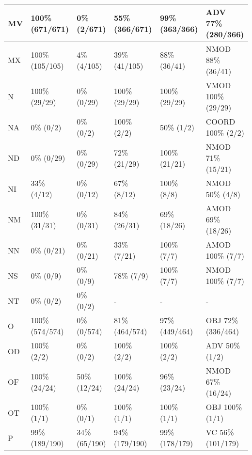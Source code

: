 \begin{small}
\begin{longtable}{|l|l|l|l|l|l|}
\hline
MV & 100\% (671/671) & 0\% (2/671) & 55\% (366/671) & 99\% (363/366) & ADV 77\% (280/366) \\ 
\hline
MX & 100\% (105/105) & 4\% (4/105) & 39\% (41/105) & 88\% (36/41) & NMOD 88\% (36/41) \\ 
\hline
N & 100\% (29/29) & 0\% (0/29) & 100\% (29/29) & 100\% (29/29) & VMOD 100\% (29/29) \\ 
\hline
NA & 0\% (0/2) & 0\% (0/2) & 100\% (2/2) & 50\% (1/2) & COORD 100\% (2/2) \\ 
\hline
ND & 0\% (0/29) & 0\% (0/29) & 72\% (21/29) & 100\% (21/21) & NMOD 71\% (15/21) \\ 
\hline
NI & 33\% (4/12) & 0\% (0/12) & 67\% (8/12) & 100\% (8/8) & NMOD 50\% (4/8) \\ 
\hline
NM & 100\% (31/31) & 0\% (0/31) & 84\% (26/31) & 69\% (18/26) & AMOD 69\% (18/26) \\ 
\hline
NN & 0\% (0/21) & 0\% (0/21) & 33\% (7/21) & 100\% (7/7) & AMOD 100\% (7/7) \\ 
\hline
NS & 0\% (0/9) & 0\% (0/9) & 78\% (7/9) & 100\% (7/7) & NMOD 100\% (7/7) \\ 
\hline
NT & 0\% (0/2) & 0\% (0/2) & - & - & - \\ 
\hline
O & 100\% (574/574) & 0\% (0/574) & 81\% (464/574) & 97\% (449/464) & OBJ 72\% (336/464) \\ 
\hline
OD & 100\% (2/2) & 0\% (0/2) & 100\% (2/2) & 100\% (2/2) & ADV 50\% (1/2) \\ 
\hline
OF & 100\% (24/24) & 50\% (12/24) & 100\% (24/24) & 96\% (23/24) & NMOD 67\% (16/24) \\ 
\hline
OT & 100\% (1/1) & 0\% (0/1) & 100\% (1/1) & 100\% (1/1) & OBJ 100\% (1/1) \\ 
\hline
P & 99\% (189/190) & 34\% (65/190) & 94\% (179/190) & 99\% (178/179) & VC 56\% (101/179) \\ 
\hline
\end{longtable}
\end{small}
